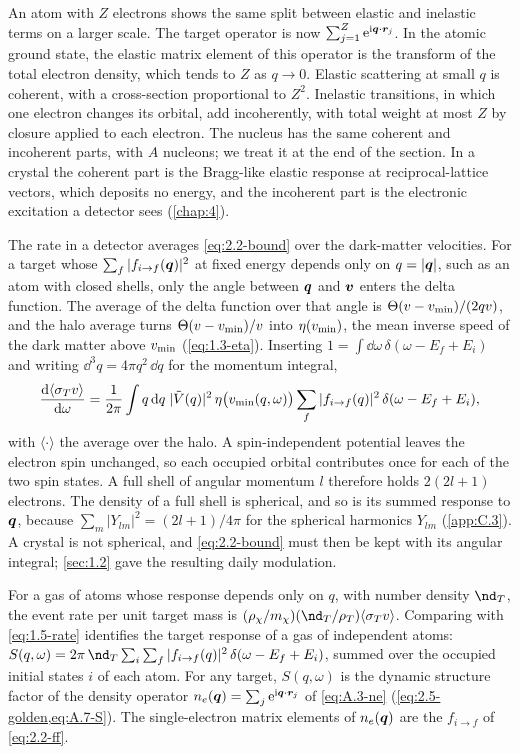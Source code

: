 An atom with $Z$ electrons shows the same split between elastic and inelastic terms on a larger scale. The target operator is now $\sum_{j=1}^Z\mathrm{e}^{\mathrm{i}\bm{q}\cdot\bm{r}_j}$. In the atomic ground state, the elastic matrix element of this operator is the transform of the total electron density, which tends to $Z$ as $q \to 0$. Elastic scattering at small $q$ is coherent, with a cross-section proportional to $Z^2$. Inelastic transitions, in which one electron changes its orbital, add incoherently, with total weight at most $Z$ by closure applied to each electron. The nucleus has the same coherent and incoherent parts, with $A$ nucleons; we treat it at the end of the section. In a crystal the coherent part is the Bragg-like elastic response at reciprocal-lattice vectors, which deposits no energy, and the incoherent part is the electronic excitation a detector sees (\cref{chap:4}).

The rate in a detector averages \cref{eq:2.2-bound} over the dark-matter velocities. For a target whose $\sum_f|f_{i\to f}(\bm{q})|^2$ at fixed energy depends only on $q = |\bm{q}|$, such as an atom with closed shells, only the angle between $\bm{q}$ and $\bm{v}$ enters the delta function. The average of the delta function over that angle is $\Theta(v - v_{\mathrm{min}})/(2qv)$, and the halo average turns $\Theta(v - v_{\mathrm{min}})/v$ into $\eta(v_{\mathrm{min}})$, the mean inverse speed of the dark matter above $v_{\mathrm{min}}$ (\cref{eq:1.3-eta}). Inserting $1 = \int\dd\omega\,\delta(\omega - E_f + E_i)$ and writing $\dd^3q = 4\pi q^2\,\dd q$ for the momentum integral,
\begin{equation}
  \frac{\mathrm{d}\langle\sigma_T v\rangle}{\mathrm{d}\omega} = \frac{1}{2\pi}\int q\,\mathrm{d} q\;|\tilde V(q)|^2\,\eta\bigl(v_{\mathrm{min}}(q, \omega)\bigr)\sum_f|f_{i\to f}(q)|^2\,\delta(\omega - E_f + E_i) ,
  \label{eq:2.2-spectrum}
\end{equation}
with $\langle\cdot\rangle$ the average over the halo. A spin-independent potential leaves the electron spin unchanged, so each occupied orbital contributes once for each of the two spin states. A full shell of angular momentum $l$ therefore holds $2(2l + 1)$ electrons. The density of a full shell is spherical, and so is its summed response to $\bm{q}$, because $\sum_m|Y_{lm}|^2 = (2l + 1)/4\pi$ for the spherical harmonics $Y_{lm}$ (\cref{app:C.3}). A crystal is not spherical, and \cref{eq:2.2-bound} must then be kept with its angular integral; \cref{sec:1.2} gave the resulting daily modulation.

For a gas of atoms whose response depends only on $q$, with number density $\nd_T$, the event rate per unit target mass is $(\rho_\chi/m_\chi)(\nd_T/\rho_T)\langle\sigma_T v\rangle$. Comparing with \cref{eq:1.5-rate} identifies the target response of a gas of independent atoms: $S(q, \omega) = 2\pi\,\nd_T\sum_i\sum_f|f_{i\to f}(q)|^2\,\delta(\omega - E_f + E_i)$, summed over the occupied initial states $i$ of each atom. For any target, $S(q, \omega)$ is the dynamic structure factor of the density operator $n_e(\bm{q}) = \sum_j\mathrm{e}^{\mathrm{i}\bm{q}\cdot\bm{r}_j}$ of \cref{eq:A.3-ne} (\cref{eq:2.5-golden,eq:A.7-S}). The single-electron matrix elements of $n_e(\bm{q})$ are the $f_{i\to f}$ of \cref{eq:2.2-ff}.

